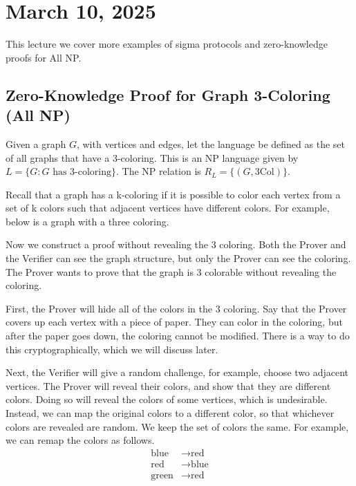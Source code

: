 \section{March 10, 2025}
\label{20250310}

This lecture we cover more examples of sigma protocols and zero-knowledge proofs for All NP.


\subsection{Zero-Knowledge Proof for Graph 3-Coloring (All NP)}

Given a graph $G$, with vertices and edges, let the language be defined as the set of all graphs that have a 3-coloring. This is an NP language given by $L = \{ G: G \text{ has 3-coloring}\}$. The NP relation is $R_L = \{ (G, \text{3Col})\}$. 

Recall that a graph has a k-coloring if it is possible to color each vertex from a set of k colors such that adjacent vertices have different colors. For example, below is a graph with a three coloring.

\begin{center}
\end{center}

Now we construct a proof without revealing the 3 coloring. Both the Prover and the Verifier can see the graph structure, but only the Prover can see the coloring. The Prover wants to prove that the graph is 3 colorable without revealing the coloring.

First, the Prover will hide all of the colors in the 3 coloring. Say that the Prover covers up each vertex with a piece of paper. They can color in the coloring, but after the paper goes down, the coloring cannot be modified. There is a way to do this cryptographically, which we will discuss later.

Next, the Verifier will give a random challenge, for example, choose two adjacent vertices. The Prover will reveal their colors, and show that they are different colors. Doing so will reveal the colors of some vertices, which is undesirable. Instead, we can map the original colors to a different color, so that whichever colors are revealed are random. We keep the set of colors the same. For example, we can remap the colors as follows.
\begin{align*}
    \text{blue} &\to \text{red}\\
    \text{red} &\to \text{blue}\\
    \text{green} &\to \text{red}
\end{align*}

